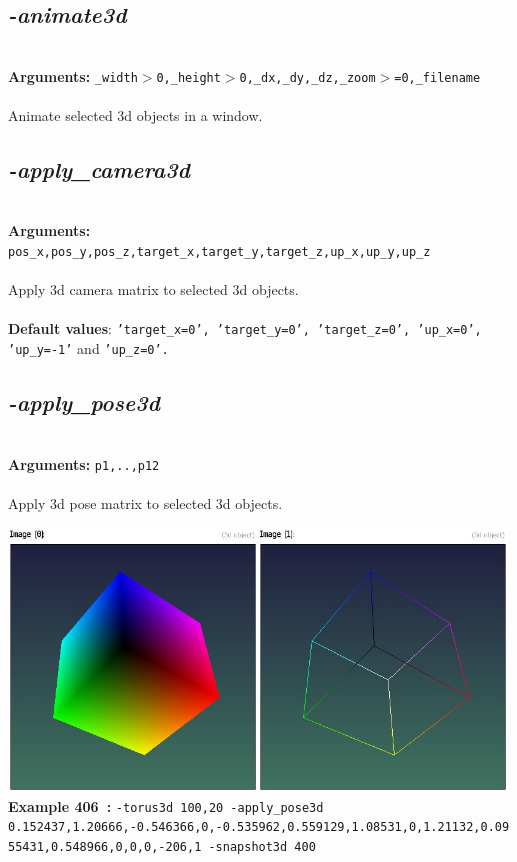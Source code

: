 \documentclass[a4paper,11pt,twoside]{book}
\begin{document}
\subsection{\emph{-animate3d} }\vspace*{-0.5em}
~\\\textbf{Arguments: } 
{\small \texttt{\_width$>$0,\_height$>$0,\_dx,\_dy,\_dz,\_zoom$>$=0,\_filename}}\\~\\
Animate selected 3d objects in a window.


\subsection{\emph{-apply\_camera3d} }\vspace*{-0.5em}
~\\\textbf{Arguments: } 
{\small \texttt{pos\_x,pos\_y,pos\_z,target\_x,target\_y,target\_z,up\_x,up\_y,up\_z}}\\~\\
Apply 3d camera matrix to selected 3d objects.
~\\~\\\textbf{Default values}: {\small \texttt{'target\_x=0', 'target\_y=0', 'target\_z=0', 'up\_x=0', 'up\_y=-1'} and \texttt{'up\_z=0'.}}


\subsection{\emph{-apply\_pose3d} }\vspace*{-0.5em}
~\\\textbf{Arguments: } 
{\small \texttt{p1,..,p12}}\\~\\
Apply 3d pose matrix to selected 3d objects.
\begin{center}\includegraphics[keepaspectratio=true,height=7cm,width=\textwidth]{img/gmic_def406.jpg}\\
{\footnotesize \textbf{Example 406~:} \texttt{-torus3d 100,20 -apply\_pose3d 0.152437,1.20666,-0.546366,0,-0.535962,0.559129,1.08531,0,1.21132,0.0955431,0.548966,0,0,0,-206,1 -snapshot3d 400}}
\end{center}
\end{document}
